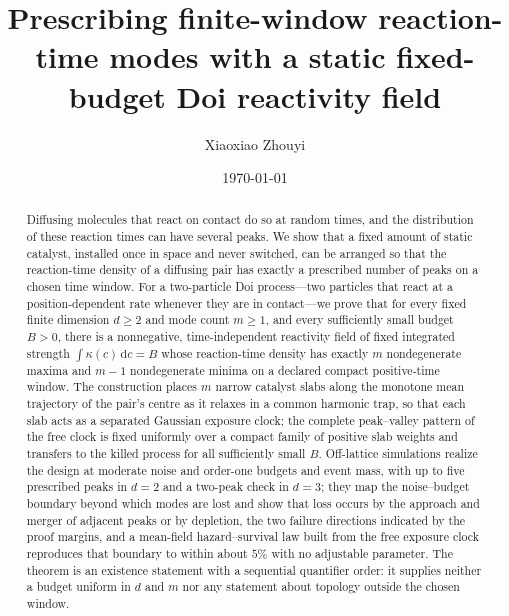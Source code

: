 \documentclass[aps,physrev,reprint,amsmath,amssymb,longbibliography,floatfix]{revtex4-2}
\newcommand{\dd}{\mathrm d}
\begin{document}
\title{Prescribing finite-window reaction-time modes with a static fixed-budget Doi reactivity field}

\author{Xiaoxiao Zhouyi}

\date{\today}

\begin{abstract}
Diffusing molecules that react on contact do so at random times, and the
distribution of these reaction times can have several peaks.  We show that
a fixed amount of static catalyst, installed once in space and never
switched, can be arranged so that the reaction-time density of a diffusing
pair has exactly a prescribed number of peaks on a chosen time window.  For a
two-particle Doi process---two particles that react at a position-dependent
rate whenever they are in contact---we prove that for every fixed finite
dimension \(d\ge2\) and mode count \(m\ge1\), and every sufficiently small
budget \(B>0\), there is a nonnegative, time-independent reactivity field of
fixed integrated strength \(\int\kappa(c)\,\dd c=B\) whose reaction-time
density has exactly \(m\) nondegenerate maxima and \(m-1\) nondegenerate
minima on a declared compact positive-time window.  The construction places
\(m\) narrow catalyst slabs along the monotone mean trajectory of the pair's
centre as it relaxes in a common harmonic trap, so that each slab acts as a
separated Gaussian exposure clock; the complete peak--valley pattern of the
free clock is fixed uniformly over a compact family of positive slab weights
and transfers to the killed process for all sufficiently small \(B\).
Off-lattice simulations realize the design at moderate noise and order-one
budgets and event mass, with up to five prescribed peaks in \(d=2\) and a
two-peak check in \(d=3\); they map the noise--budget boundary beyond which
modes are lost and show that loss occurs by the approach and merger of
adjacent peaks or by depletion, the two failure directions indicated by the
proof margins, and a mean-field
hazard--survival law built from the free exposure clock reproduces that
boundary to within about \(5\%\) with no adjustable parameter.  The theorem
is an existence statement with a sequential quantifier order: it supplies
neither a budget uniform in \(d\) and \(m\) nor any statement about topology
outside the chosen window.
\end{abstract}

\maketitle
\end{document}
